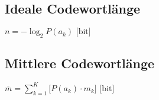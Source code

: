 \begin{multicols}{2}
\subsection*{Ideale Codewortlänge}
$\displaystyle n = -\log_2{P(a_k)} \mbox{  [bit]}$

\subsection*{Mittlere Codewortlänge}
$\displaystyle \overline{m} = 
	\sum_{k=1}^{K} \bigg[ P(a_k) 
	\cdot m_k \bigg] \mbox{  [bit]}$

\end{multicols}

